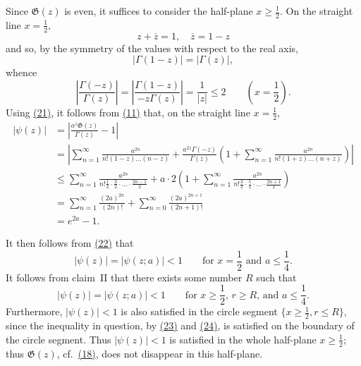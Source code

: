 \documentclass{article}
\theoremstyle{plain}
\newcommand{\GG}{\mathfrak{G}}
\renewcommand{\geq}{\geqslant}
\renewcommand{\leq}{\leqslant}
\newcommand{\oldpage}[1]{\marginpar{\footnotesize$\Big\vert$ \textit{p.~#1}}}
\begin{document}
\begin{enumerate}[I.]
    Since $\GG(z)$ is even, it suffices to consider the half-plane $x\geq\frac12$.
    On the straight line $x=\frac12$,
    \[
      z+\overline{z} = 1,
      \quad \overline{z} = 1-z
    \]
    and so, by the symmetry of the values with respect to the real axis,
    \[
      |\Gamma(1-z)| = |\Gamma(z)|,
    \]
    whence
    \[
    \label{21}
      \left\vert
        \frac{\Gamma(-z)}{\Gamma(z)}
      \right\vert = \left\vert
        \frac{\Gamma(1-z)}{-z\Gamma(z)}
      \right\vert = \frac{1}{|z|} \leq 2
      \qquad\left(
        x=\frac12
      \right).
    \tag{21}
    \]
    Using \hyperref[21]{(21)}, it follows from \hyperref[11]{(11)} that, on the straight line $x=\frac12$,
    \[
    \label{22}
      \begin{aligned}
        |\psi(z)|
        &= \left\vert
          \frac{a^z\GG(z)}{\Gamma(z)} - 1
        \right\vert
      \\&= \left\vert
          \sum_{n=1}^\infty \frac{a^{2n}}{n!(1-z)\ldots(n-z)}
          + \frac{a^{2z}\Gamma(-z)}{\Gamma(z)} \left(
            1 + \sum_{n=1}^\infty \frac{a^{2n}}{n!(1+z)\ldots(n+z)}
          \right)
        \right\vert
      \\&\leq \sum_{n=1}^\infty \frac{a^{2n}}{n!\frac12\cdot\frac32\cdot\ldots\cdot\frac{2n-1}{2}} + a\cdot2 \left(
        1 + \sum_{n=1}^\infty \frac{a^{2n}}{n!\frac32\cdot\frac52\cdot\ldots\cdot\frac{2n+1}{2}}
      \right)
      \\&= \sum_{n=1}^\infty \frac{(2a)^{2n}}{(2n)!} + \sum_{n=0}^\infty \frac{(2a)^{2n+1}}{(2n+1)!}
      \\&= e^{2a}-1.
      \end{aligned}
    \tag{22}
    \]

  \oldpage{311}
    It then follows from \hyperref[22]{(22)} that
    \[
    \label{23}
      |\psi(z)| = |\psi(z;a)| < 1
      \qquad\mbox{for $x=\frac12$ and $a\leq\frac14$.}
    \tag{23}
    \]
    It follows from claim~II that there exists some number $R$ such that
    \[
    \label{24}
      |\psi(z)| = |\psi(z;a)| <1
      \qquad\mbox{for $x\geq\frac12$, $r\geq R$, and $a\leq\frac14$.}
    \tag{24}
    \]
    Furthermore, $|\psi(z)|<1$ is also satisfied in the circle segment $\{x\geq\frac12,r\leq R\}$, since the inequality in question, by \hyperref[23]{(23)} and \hyperref[24]{(24)}, is satisfied on the boundary of the circle segment.
    Thus $|\psi(z)|<1$ is satisfied in the whole half-plane $x\geq\frac12$;
    thus $\GG(z)$, cf.~\hyperref[18]{(18)}, does not disappear in this half-plane.


\end{enumerate}
\end{document}
